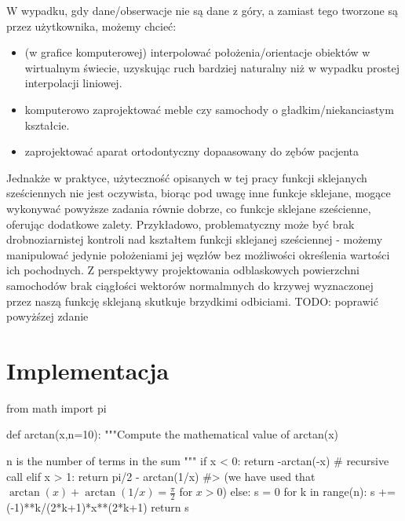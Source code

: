 \documentclass{article}
\begin{document}
W wypadku, gdy dane/obserwacje nie są dane z góry, a zamiast tego tworzone są przez użytkownika, możemy chcieć:

\begin{itemize}
\item (w grafice komputerowej) interpolować położenia/orientacje obiektów w wirtualnym świecie, uzyskując ruch bardziej naturalny niż w wypadku prostej interpolacji liniowej.
\item komputerowo zaprojektować  meble czy samochody o gładkim/niekanciastym kształcie.
\item zaprojektować aparat ortodontyczny dopaasowany do zębów pacjenta \cite{Ahmad2012ApplicationOC}
\end{itemize} 

Jednakże w praktyce, użyteczność opisanych w tej pracy funkcji sklejanych sześciennych nie jest oczywista, biorąc pod uwagę inne funkcje sklejane, mogące wykonywać powyższe zadania równie dobrze, co funkcje sklejane sześcienne, oferując dodatkowe zalety. Przykładowo, problematyczny może być brak drobnoziarnistej kontroli nad kształtem funkcji sklejanej sześciennej - możemy manipulować jedynie położeniami jej węzłów bez możliwości określenia wartości ich  pochodnych. 
Z perspektywy projektowania odblaskowych powierzchni samochodów brak ciągłości wektorów normalmnych do krzywej wyznaczonej przez naszą funkcję sklejaną skutkuje brzydkimi odbiciami.
TODO: poprawić powyżśzej zdanie

\newpage
\section{Implementacja}

\begin{python}
from math import pi

def arctan(x,n=10):
   """Compute the mathematical value of arctan(x)

   n is the number of terms in the sum
   """
    if x < 0:
        return -arctan(-x) # recursive call
    elif x > 1: 
        return pi/2 - arctan(1/x) 
        #> (we have used that $\arctan(x)+\arctan(1/x)=\frac{\pi}{2}$ for $x>0$)
    else: 
        s = 0
        for k in range(n):
            s += (-1)**k/(2*k+1)*x**(2*k+1)
        return s 
\end{python}
\end{document}
